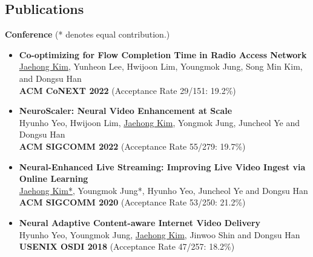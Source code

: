 \documentclass[margin,line,letter]{cv}
\def \pubitem {\vspace{0.07in}\item}
\begin{document}
\begin{resume}

\section{\sc Publications \\}
\textbf{Conference}
(* denotes equal contribution.)
\begin{itemize}[leftmargin=.2in]
	\pubitem {\textbf{Co-optimizing for Flow Completion Time in Radio Access Network} \\ \underline{Jaehong Kim}, Yunheon Lee, Hwijoon Lim, Youngmok Jung, Song Min Kim, and Dongsu Han \\ \textbf{ACM CoNEXT 2022} (Acceptance Rate 29/151: 19.2\%)}	
	\pubitem {\textbf{NeuroScaler: Neural Video Enhancement at Scale} \\ Hyunho Yeo, Hwijoon Lim, \underline{Jaehong Kim}, Yongmok Jung, Juncheol Ye and Dongsu Han \\ \textbf{ACM SIGCOMM 2022} (Acceptance Rate 55/279: 19.7\%)}	
	\pubitem {\textbf{Neural-Enhanced Live Streaming: Improving Live Video Ingest via Online Learning} \\ \underline{Jaehong Kim*}, Youngmok Jung*, Hyunho Yeo, Juncheol Ye and Dongsu Han \\ \textbf{ACM SIGCOMM 2020} (Acceptance Rate 53/250: 21.2\%)}
	\pubitem {\textbf{Neural Adaptive Content-aware Internet Video Delivery} \\ Hyunho Yeo, Youngmok Jung, \underline{Jaehong Kim}, Jinwoo Shin and Dongsu Han \\ \textbf{USENIX OSDI 2018} (Acceptance Rate 47/257: 18.2\%)}
\end{itemize}


\vspace{0.2cm}





\end{resume}
\end{document}
